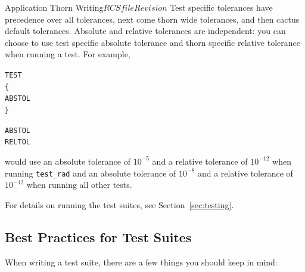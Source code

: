 \begin{cactuspart}{Application Thorn Writing}{$RCSfile$}{$Revision$}
Test specific tolerances have precedence over all tolerances, next
come thorn wide tolerances, and then cactus default tolerances.
Absolute and relative tolerances are independent: you can choose to
use test specific absolute tolerance and thorn specific relative
tolerance when running a test. For example,

\begin{alltt}
TEST 
\{
  ABSTOL 
\}

ABSTOL  
RELTOL  
\end{alltt}

would use an absolute tolerance of $10^{-5}$ and a relative tolerance of
$10^{-12}$ when running \verb|test_rad| and an absolute tolerance of $10^{-8}$
and a relative tolerance of $10^{-12}$ when running all other tests.

For details on running the test suites, see Section~\ref{sec:testing}.

\subsection{Best Practices for Test Suites}

When writing a test suite, there are a few things you should keep in
mind:


\end{cactuspart}

